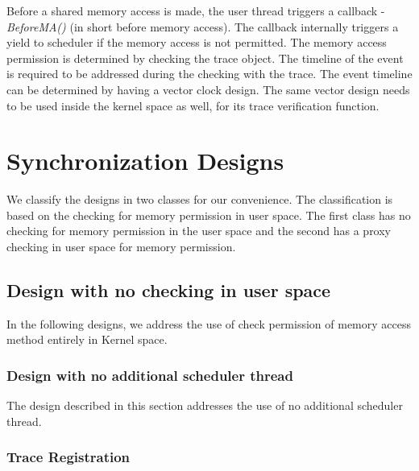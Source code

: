 Before a shared memory access is made, the user thread triggers a callback - \emph{BeforeMA()} (in short before memory access). 
The callback internally triggers a yield to scheduler if the memory access is not permitted. 
The memory access permission is determined by checking the trace object. 
The timeline of the event is required to be addressed during the checking with the trace. 
The event timeline can be determined by having a vector clock design. 
The same vector design needs to be used inside the kernel space as well, for its trace verification function.



\section{Synchronization Designs}

We classify the designs in two classes for our convenience. 
The classification is based on the checking for memory permission in user space. 
The first class has no checking for memory permission in the user space and the second has a proxy checking in user space for memory permission. 


\subsection{Design with no checking in user space}

In the following designs, we address the use of check permission of memory access method entirely in Kernel space.

\subsubsection{Design with no additional scheduler thread} \label{no_check_no_add}

The design described in this section addresses the use of no additional scheduler thread. 


\subsubsection*{Trace Registration}

